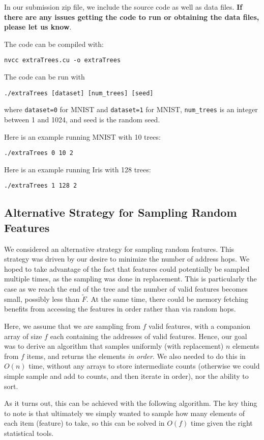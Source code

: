 \documentclass[10pt,conference]{IEEEtran}
\begin{document}
  In our submission zip file, we include the source code as well as data files. \textbf{If there are any issues getting the code to run or obtaining the data files, please let us know}.
  
  The code can be compiled with:
  
  \texttt{nvcc extraTrees.cu -o extraTrees}
  
  The code can be run with
  
  \texttt{./extraTrees [dataset] [num\_trees] [seed]}
  
  where \texttt{dataset=0} for MNIST and \texttt{dataset=1} for MNIST, \texttt{num\_trees} is an integer between 1 and 1024, and seed is the random seed.
  
  Here is an example running MNIST with 10 trees:
  
  \texttt{./extraTrees 0 10 2}
  
  Here is an example running Iris with 128 trees:
  
  \texttt{./extraTrees 1 128 2}

\subsection{\textbf{Alternative Strategy for Sampling Random Features}}
We considered an alternative strategy for sampling random features. This strategy was driven by our desire to minimize the number of address hops. We hoped to take advantage of the fact that features could potentially be sampled multiple times, as the sampling was done in replacement. This is particularly the case as we reach the end of the tree and the number of valid features becomes small, possibly less than $\tilde{F}$. At the same time, there could be memory fetching benefits from accessing the features in order rather than via random hops.  

Here, we assume that we are sampling from $f$ valid features, with a companion array of size $f$ each containing the addresses of valid features. Hence, our goal was to derive an algorithm that samples uniformly (with replacement) $n$ elements from $f$ items, and returns the elements \textit{in order}. We also needed to do this in $O(n)$ time, without any arrays to store intermediate counts (otherwise we could simple sample and add to counts, and then iterate in order), nor the ability to sort. 

As it turns out, this can be achieved with the following algorithm. The key thing to note is that ultimately we simply wanted to sample how many elements of each item (feature) to take, so this can be solved in $O(f)$ time given the right statistical tools.
\end{document}
